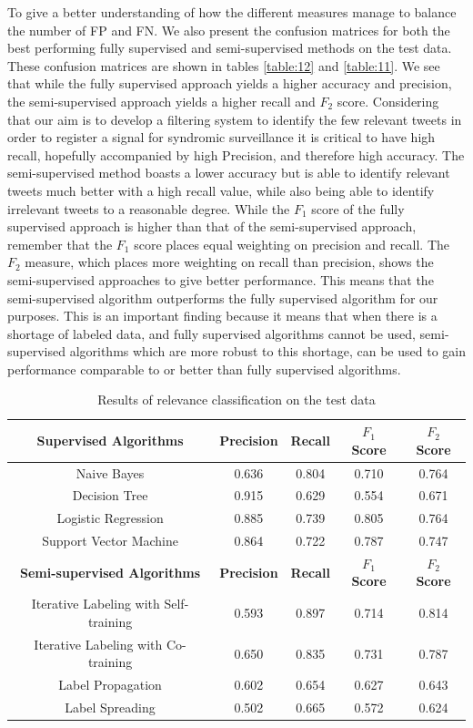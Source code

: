 \documentclass[10pt,letterpaper]{article}
\begin{document}
To give a better understanding of how the different measures manage to balance the number of FP and FN. We also present the confusion matrices for both the best performing fully supervised and semi-supervised methods on the test data. These confusion matrices are shown in tables  \ref{table:12} and \ref{table:11}. We see that while the fully supervised approach yields a higher accuracy and precision, the semi-supervised approach yields a higher recall and $F_2$ score. Considering that our aim is to develop a filtering system to identify the few relevant tweets in order to register a signal for syndromic surveillance it is critical to have high recall, hopefully accompanied by high Precision, and therefore high accuracy. The semi-supervised method boasts a lower accuracy but is able to identify relevant tweets much better with a high recall value, while also being able to identify irrelevant tweets to a reasonable degree. While the $F_1$ score of the fully supervised approach is higher than that of the semi-supervised approach, remember that the $F_1$ score places equal weighting on precision and recall. The $F_2$ measure, which places more weighting on recall than precision,  shows the semi-supervised approaches to give better performance. This means that the semi-supervised algorithm outperforms the fully supervised algorithm for our purposes.
This is an important finding because it means that when there is a shortage of labeled data, and fully supervised algorithms cannot be used, semi-supervised algorithms which are more robust to this shortage, can be used to gain performance comparable to or better than fully supervised algorithms.\\ 
\begin{table}[h!]
\centering
\begin{tabular}{ | c | c | c | c | c | }
  \hline
   \textbf{Supervised Algorithms} & \textbf{Precision} & \textbf{Recall} & \textbf{$F_1$ Score} & \textbf{$F_2$ Score} \\
  \hline\hline
  Naive Bayes & 0.636 & 0.804 & 0.710 & 0.764 \\ 
  \hline
  Decision Tree & 0.915 & 0.629 & 0.554 & 0.671 \\ 
  \hline
  Logistic Regression & 0.885 & 0.739 & 0.805 & 0.764 \\ 
  \hline
  Support Vector Machine & 0.864 & 0.722 & 0.787 & 0.747 \\ 
  \hline
  \textbf{Semi-supervised Algorithms} & \textbf{Precision} & \textbf{Recall} & \textbf{$F_1$ Score} & \textbf{$F_2$ Score}\\
  \hline\hline
  Iterative Labeling with Self-training & 0.593 & 0.897 & 0.714 & 0.814 \\
  \hline
  Iterative Labeling with Co-training & 0.650 & 0.835 & 0.731 & 0.787 \\
  \hline
  Label Propagation & 0.602 & 0.654 & 0.627 & 0.643 \\
  \hline
  Label Spreading & 0.502 & 0.665 & 0.572 & 0.624 \\
  \hline
\end{tabular}
\caption{Results of relevance classification on the test data}
\label{table:3}
\end{table}
\end{document}
